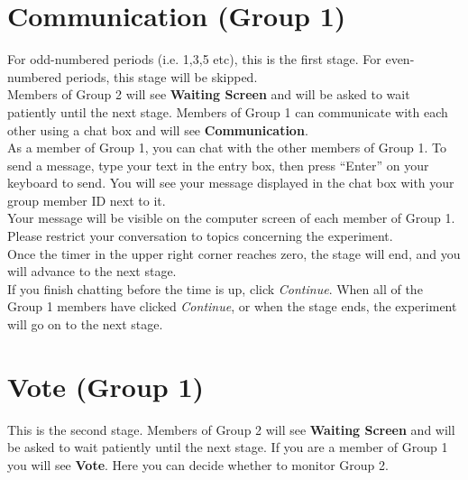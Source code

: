 \documentclass[12pt]{article}
\begin{document}
\section{Communication (Group 1)}


For odd-numbered periods (i.e. 1,3,5 etc), this is the first stage. For even-numbered periods, this stage will be skipped.\\ 

Members of Group 2 will see {\bf Waiting Screen} and will be asked to wait patiently until the next stage. Members of Group 1 can communicate with each other using a chat box and will see {\bf Communication}.\\  

As a member of Group 1, you can chat with the other members of Group 1.  To send a message, type your text in the entry box, then press ``Enter'' on your keyboard to send.  You will see your message displayed in the chat box with your group member ID next to it.\\ 

Your message will be visible on the computer screen of each member of Group 1. Please restrict your conversation to topics concerning the experiment.\\  

Once the timer in the upper right corner reaches zero, the stage will end, and you will advance to the next stage.\\

If you finish chatting before the time is up, click {\em Continue}. When all of the Group 1 members have clicked {\em Continue}, or when the stage ends, the experiment will go on to the next stage.\\  


\iffalse

\section{Vote (Group 1)}

This is the second stage. Members of Group 2 will see {\bf Waiting Screen} and will be asked to wait patiently until the next stage. If you are a member of Group 1 you will see {\bf Vote}. Here you can decide whether to monitor Group 2.\\ 
\end{document}
